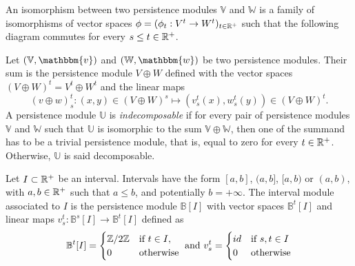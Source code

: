 \begin{definition}
    An isomorphism between two persistence modules $\mathbb{V}$ and
    $\mathbb{W}$ is a family of isomorphisms of vector spaces $\phi = (\phi_t:
    V^t \to W^t)_{t\in \mathbb{R}^+}$ such that the following diagram commutes for
    every $s \le t \in \mathbb{R}^+$.
    
    \begin{figure}[H]
        \begin{center}
        \end{center}
    \end{figure} 
\end{definition}

\begin{definition}
    Let $(\mathbb{V}, \mathbbm{v})$ and $(\mathbb{W}, \mathbbm{w})$ be two
    persistence modules. Their sum is the persistence module $V \oplus W$
    defined with the vector spaces $(V \oplus W)^t = V^t \oplus W^t$ and
    the linear maps
    $$(v \oplus w)^t_s : (x,y) \in (V \oplus W)^s \mapsto (v_s^t(x), w_s^t(y))
    \in (V \oplus W)^t.$$
    A persistence module $\mathbb{U}$ is {\it indecomposable} if for every
    pair of persistence modules $\mathbb{V}$ and $\mathbb{W}$ such that
    $\mathbb{U}$ is isomorphic to the sum $\mathbb{V} \oplus \mathbb{W}$, then
    one of the summand has to be a trivial persistence module, that is, equal
    to zero for every $t \in \mathbb{R}^+$. Otherwise, $\mathbb{U}$ is said
    decomposable.
\end{definition}

\begin{definition}
    Let $I \subset \mathbb{R}^+$ be an interval. Intervals have the form $[a, b]$,
    $(a, b]$, $[a, b)$ or $(a, b)$, with $a, b \in \mathbb{R}^+$ such that $a \le b$,
    and potentially $b = +\infty$. The interval module associated to $I$ is
    the persistence module $\mathbb{B}[I]$ with vector spaces
    $\mathbb{B}^t[I]$ and linear maps $v^t_s: \mathbb{B}^s[I] \to
    \mathbb{B}^t[I]$ defined as 
    $$
    \mathbb{B}^t[I] = \begin{cases}
        \mathbb{Z}/2\mathbb{Z} &\text{if } t \in I, \\
        0 &\text{otherwise}
    \end{cases} \text{ and } 
    v_s^t = \begin{cases}
        id &\text{if }s,t \in I \\
        0 &\text{otherwise}
    \end{cases}
    $$
\end{definition}

